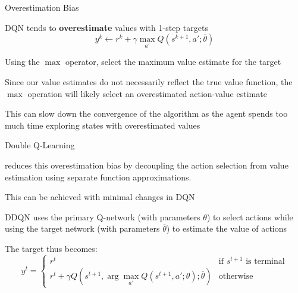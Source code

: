 \begin{frame}[t]{Overestimation Bias}

\begin{problembox}
    DQN tends to \textbf{overestimate} values with 1-step targets
    \vspace{0pt}
    \[
    y^k \gets r^k + \gamma \max_{a'} Q(s^{k+1}, a'; \bar{\theta})
    \]

    \only\blist
        \item Using the $\max$ operator, select the maximum value estimate for the target 
        \item Since our value estimates do not necessarily reflect the true value function, the $\max$ operation will likely select an overestimated action-value estimate
        \item  This can slow down the convergence of the algorithm as the agent spends too much time exploring states with overestimated values
    \elist
\end{problembox}

\end{frame}

\begin{frame}[t]{Double Q-Learning}

\begin{solutionbox}
     reduces this overestimation bias by decoupling the action selection from value estimation using separate function approximations.

    \blist
        \item This can be achieved with minimal changes in DQN
        \item DDQN  uses the primary Q-network (with parameters $\theta$) to select actions while using the target network (with parameters $\bar{\theta}$) to estimate the value of actions
        \item The target thus becomes:
    \elist
    \vspace{0pt}
    \[
    y^t = \begin{cases} 
    r^t & \text{if } s^{t+1} \text{ is terminal} \\
    r^t + \gamma Q(s^{t+1}, \arg\max_{a'} Q(s^{t+1}, a'; \theta); \bar{\theta}) & \text{otherwise}
    \end{cases}
    \]
\end{solutionbox}
    
\end{frame}

